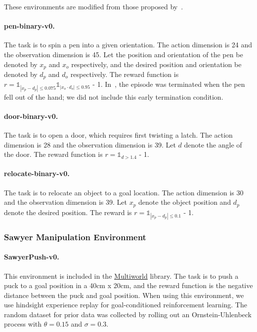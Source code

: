 \documentclass[conference]{IEEEtran}
\begin{document}
These environments are modified from those proposed by~\citet{rajeswaran2018dextrous}.

\paragraph{pen-binary-v0.} The task is to spin a pen into a given orientation. The action dimension is 24 and the observation dimension is 45. Let the position and orientation of the pen be denoted by $x_p$ and $x_o$ respectively, and the desired position and orientation be denoted by $d_p$ and $d_o$ respectively. The reward function is $r = \mathds{1}_{|x_p - d_p| \leq 0.075} \mathds{1}_{|x_o \cdot d_o| \leq 0.95}$ - 1.
In~\citet{rajeswaran2018dextrous}, the episode was terminated when the pen fell out of the hand; we did not include this early termination condition.

\paragraph{door-binary-v0.} The task is to open a door, which requires first twisting a latch. The action dimension is 28 and the observation dimension is 39. Let $d$ denote the angle of the door. The reward function is $r = \mathds{1}_{d > 1.4}$ - 1.

\paragraph{relocate-binary-v0.} The task is to relocate an object to a goal location. The action dimension is 30 and the observation dimension is 39. Let $x_p$ denote the object position and $d_p$ denote the desired position. The reward is $r = \mathds{1}_{|x_p - d_p| \leq 0.1}$ - 1.

\subsubsection{Sawyer Manipulation Environment}

\paragraph{SawyerPush-v0.} This environment is included in the \href{https://github.com/vitchyr/multiworld}{Multiworld} library. The task is to push a puck to a goal position in a 40cm x 20cm, and the reward function is the negative distance between the puck and goal position. When using this environment, we use hindsight experience replay for goal-conditioned reinforcement learning. The random dataset for prior data was collected by rolling out an Ornstein-Uhlenbeck process with $\theta = 0.15$ and $\sigma = 0.3$.
\end{document}
